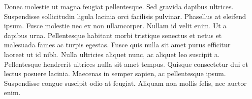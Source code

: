 Donec molestie ut magna feugiat pellentesque. Sed gravida dapibus ultrices. Suspendisse sollicitudin ligula lacinia orci facilisis pulvinar. Phasellus at eleifend ipsum. Fusce molestie nec ex non ullamcorper. Nullam id velit enim. Ut a dapibus urna. Pellentesque habitant morbi tristique senectus et netus et malesuada fames ac turpis egestas. Fusce quis nulla sit amet purus efficitur laoreet ut id nibh. Nulla ultricies aliquet nunc, ac aliquet leo suscipit a. Pellentesque hendrerit ultrices nulla sit amet tempus. Quisque consectetur dui et lectus posuere lacinia. Maecenas in semper sapien, ac pellentesque ipsum. Suspendisse congue suscipit odio at feugiat. Aliquam non mollis felis, nec auctor enim.